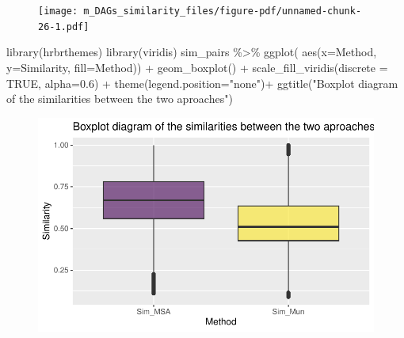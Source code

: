 \documentclass[
  letterpaper,
  DIV=11,
  numbers=noendperiod]{scrreprt}
\newenvironment{Shaded}{}{}
\newcommand{\AttributeTok}[1]{\textcolor[rgb]{0.78,0.47,0.87}{#1}}
\newcommand{\ConstantTok}[1]{\textcolor[rgb]{0.82,0.60,0.40}{#1}}
\newcommand{\FloatTok}[1]{\textcolor[rgb]{0.82,0.60,0.40}{#1}}
\newcommand{\FunctionTok}[1]{\textcolor[rgb]{0.38,0.69,0.94}{#1}}
\newcommand{\NormalTok}[1]{\textcolor[rgb]{0.67,0.70,0.75}{#1}}
\newcommand{\SpecialCharTok}[1]{\textcolor[rgb]{0.34,0.71,0.76}{#1}}
\newcommand{\StringTok}[1]{\textcolor[rgb]{0.60,0.76,0.47}{#1}}
\begin{document}
\begin{figure}[H]

{\centering \texttt{[image: m\_DAGs\_similarity\_files/figure-pdf/unnamed-chunk-26-1.pdf]}

}

\end{figure}

\begin{Shaded}
\begin{Highlighting}[]
\FunctionTok{library}\NormalTok{(hrbrthemes)}
\FunctionTok{library}\NormalTok{(viridis)}
\NormalTok{sim\_pairs }\SpecialCharTok{\%\textgreater{}\%}
  \FunctionTok{ggplot}\NormalTok{( }\FunctionTok{aes}\NormalTok{(}\AttributeTok{x=}\NormalTok{Method, }\AttributeTok{y=}\NormalTok{Similarity, }\AttributeTok{fill=}\NormalTok{Method)) }\SpecialCharTok{+}
  \FunctionTok{geom\_boxplot}\NormalTok{() }\SpecialCharTok{+}
  \FunctionTok{scale\_fill\_viridis}\NormalTok{(}\AttributeTok{discrete =} \ConstantTok{TRUE}\NormalTok{, }\AttributeTok{alpha=}\FloatTok{0.6}\NormalTok{) }\SpecialCharTok{+}
  \FunctionTok{theme}\NormalTok{(}\AttributeTok{legend.position=}\StringTok{"none"}\NormalTok{)}\SpecialCharTok{+}
  \FunctionTok{ggtitle}\NormalTok{(}\StringTok{"Boxplot diagram of the similarities between the two aproaches"}\NormalTok{) }
\end{Highlighting}
\end{Shaded}

\begin{figure}[H]

{\centering \includegraphics[width=1\textwidth,height=\textheight]{m_DAGs_similarity_files/figure-pdf/unnamed-chunk-27-1.pdf}

}

\end{figure}
\end{document}
